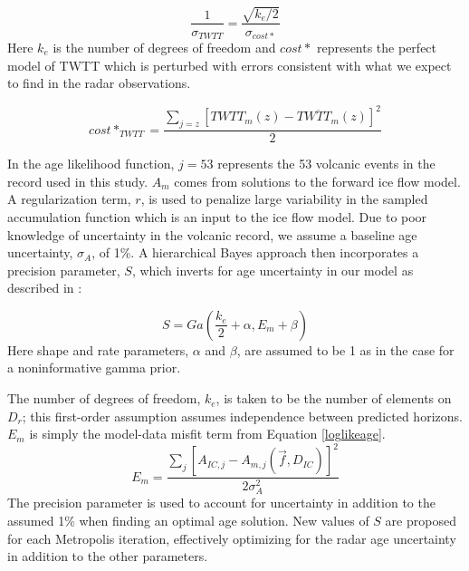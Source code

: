 \begin{equation}
\frac{1}{\sigma_{TWTT}}= \frac{\sqrt{k_e/2}}{\sigma_{cost*}}
\end{equation}
Here $k_e$ is the number of degrees of freedom and $cost*$ represents the perfect model of TWTT which is perturbed with errors consistent with what we expect to find in the radar observations. 

\begin{equation}
cost*_{TWTT} = \frac{\sum_{j = z}[TWTT_m(z) - \overline{TWTT_m}(z)]^2}{2}
\end{equation}

In the age likelihood function, $j=53$ represents the 53 volcanic events in the record used in this study. $A_m$ comes from solutions to the forward ice flow model. A regularization term, $r$, is used to penalize large variability in the sampled accumulation function which is an input to the ice flow model. Due to poor knowledge of uncertainty in the volcanic record, we assume a baseline age uncertainty, $\sigma_A$, of 1\%.  A hierarchical Bayes approach then incorporates a precision parameter, $S$, which inverts for age uncertainty in our model as described in \citet{jackson&huerta2016}:

\begin{equation}
S = Ga(\frac{k_e}{2}+\alpha, E_m+\beta)
\end{equation}
Here shape and rate parameters, $\alpha$ and $\beta$, are assumed to be 1 as in the case for a noninformative gamma prior. 

The number of degrees of freedom, $k_e$, is taken to be the number of elements on $D_r$; this first-order assumption assumes independence between predicted horizons. $E_m$ is simply the model-data misfit term from Equation \ref{loglikeage}.
\begin{equation}
 E_m= \frac{\sum_{j}[A_{IC,j} - A_{m,j}(\vec{f},D_{IC})]^2}{2\sigma_A^2} 
\end{equation}
The precision parameter is used to account for uncertainty in addition to the assumed 1\% when finding an optimal age solution. New values of $S$ are proposed for each Metropolis iteration, effectively optimizing for the radar age uncertainty in addition to the other parameters.



